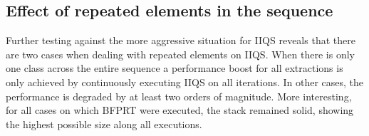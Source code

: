 \subsection{Effect of repeated elements in the sequence}

Further testing against the more aggressive situation for IIQS reveals that there are two cases when dealing with repeated elements on IIQS. When there is only one class across the entire sequence a performance boost for all extractions is only achieved by continuously executing IIQS on all iterations. In other cases, the performance is degraded by at least two orders of magnitude. More interesting, for all cases on which BFPRT were executed, the stack remained solid, showing the highest possible size along all executions.\\



